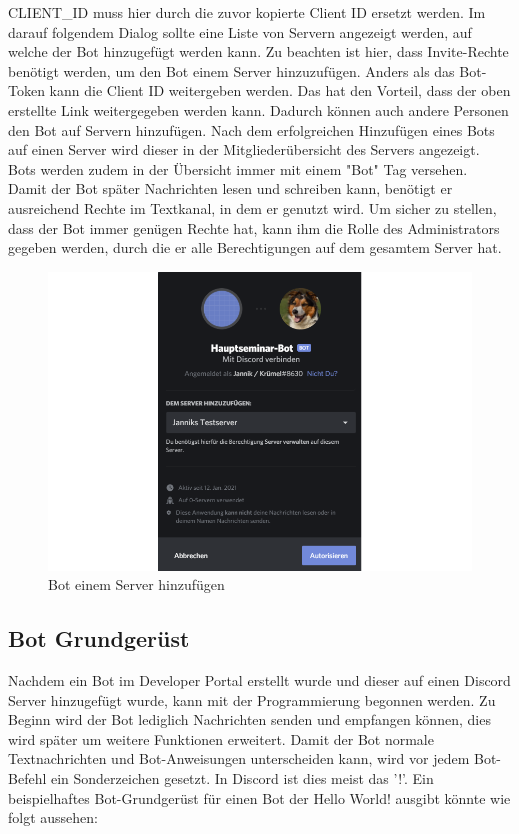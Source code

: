 \documentclass[sigplan,screen]{acmart}
\begin{document}
\noindent CLIENT\_ID muss hier durch die zuvor kopierte Client ID ersetzt werden.
Im darauf folgendem Dialog sollte eine Liste von Servern angezeigt werden, auf welche der Bot hinzugefügt werden kann. Zu beachten ist hier, dass Invite-Rechte benötigt werden, um den Bot einem Server hinzuzufügen. Anders als das Bot-Token kann die Client ID weitergeben werden. Das hat den Vorteil, dass der oben erstellte Link weitergegeben werden kann. Dadurch können auch andere Personen den Bot auf Servern hinzufügen. Nach dem erfolgreichen Hinzufügen eines Bots auf einen Server wird dieser in der Mitgliederübersicht des Servers angezeigt. Bots werden zudem in der Übersicht immer mit einem "Bot" Tag versehen. \\
\noindent Damit der Bot später Nachrichten lesen und schreiben kann, benötigt er ausreichend Rechte im Textkanal, in dem er genutzt wird. Um sicher zu stellen, dass der Bot immer genügen Rechte hat, kann ihm die Rolle des Administrators gegeben werden, durch die er alle Berechtigungen auf dem gesamtem Server hat.


\begin{figure}[h]
  \centering
  \includegraphics[width=\linewidth]{discord_add}
  \caption{Bot einem Server hinzufügen}
\end{figure}

\newpage

\subsection{Bot Grundgerüst}


Nachdem ein Bot im Developer Portal erstellt wurde und dieser auf einen Discord Server hinzugefügt wurde, kann mit der Programmierung begonnen werden. Zu Beginn wird der Bot lediglich Nachrichten senden und empfangen können, dies wird später um weitere Funktionen erweitert. Damit der Bot normale Textnachrichten und Bot-Anweisungen unterscheiden kann, wird vor jedem Bot-Befehl ein Sonderzeichen gesetzt. In Discord ist dies meist das '!'. Ein beispielhaftes Bot-Grundgerüst für einen Bot der Hello World! ausgibt könnte wie folgt aussehen:
\end{document}
